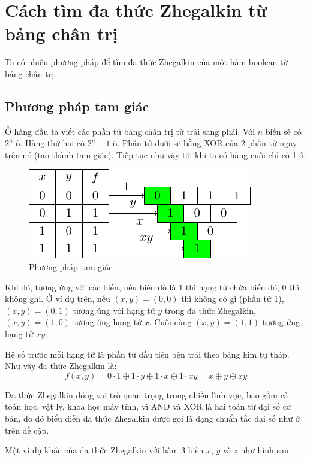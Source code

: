 \section{Cách tìm đa thức Zhegalkin từ bảng chân trị}

Ta có nhiều phương pháp để tìm đa thức Zhegalkin của một hàm 
boolean từ bảng chân trị. 

\subsection{Phương pháp tam giác}

Ở hàng đầu ta viết các phần
tử bảng chân trị từ trái sang phải. Với $n$ biến sẽ có $2^n$ ô.
Hàng thứ hai có $2^n-1$ ô. Phần tử dưới sẽ bằng XOR của 2 phần tử 
ngay trên nó (tạo thành tam giác). Tiếp tục như vậy tới khi
ta có hàng cuối chỉ có 1 ô.

\begin{figure}[ht]
    \centering
    \includegraphics{../pics/boolean/zhegalkin1.pdf}
    \caption{Phương pháp tam giác}
\end{figure}

Khi đó, tương ứng với các biến, nếu biến đó là 1 thì hạng tử chứa
biến đó, 0 thì không ghi. Ở ví dụ trên, nếu $(x, y) = (0, 0)$ 
thì không có gì (phần tử 1), $(x, y) = (0, 1)$ tương ứng với hạng 
tử $y$ trong đa thức Zhegalkin, $(x, y) = (1, 0)$ tương ứng hạng
tử $x$. Cuối cùng $(x, y) = (1, 1)$ tương ứng hạng tử $xy$.

Hệ số trước mỗi hạng tử là phần tử đầu tiên bên trái theo bảng
kim tự tháp. Như vậy đa thức Zhegalkin là:
\begin{equation*}
    f(x, y) = 0 \cdot 1 \oplus 1 \cdot y \oplus 1 \cdot x \oplus 
        1 \cdot xy = x \oplus y \oplus xy
\end{equation*}

Đa thức Zhegalkin đóng vai trò quan trọng trong nhiều lĩnh vực,
bao gồm cả toán học, vật lý, khoa học máy tính, vì AND và XOR
là hai toán tử đại số cơ bản, do đó biểu diễn đa thức Zhegalkin
được gọi là dạng chuẩn tắc đại số như ở trên đề cập.

Một ví dụ khác của đa thức Zhegalkin với hàm 3 biến $x$, $y$ và $z$
như hình sau:

